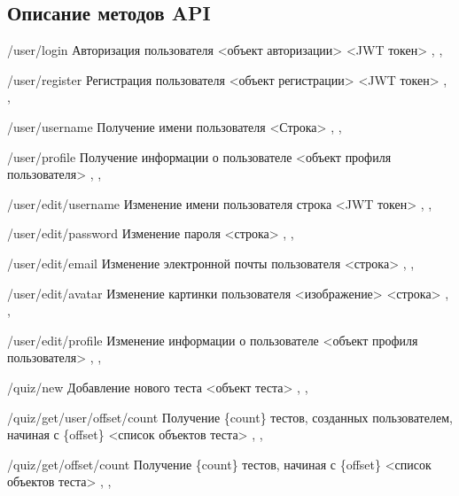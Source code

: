 


\subsection{Описание методов API}

 {/user/login}
{Авторизация пользователя}
{<объект авторизации>}
{<JWT токен>}
{ \sep {} \sep {}}

 {/user/register}
{Регистрация пользователя}
{<объект регистрации>}
{<JWT токен>}
{ \sep {} \sep {}}

 {/user/username}
{Получение имени пользователя}
{}
{<Строка>}
{ \sep {} \sep {}}


 {/user/profile}
{Получение информации о пользователе}
{}
{<объект профиля пользователя>}
{ \sep {} \sep {}}



 {/user/edit/username}
{Изменение имени пользователя}
{строка}
{<JWT токен>}
{ \sep {} \sep {}}


 {/user/edit/password}
{Изменение пароля}
{<строка>}
{}
{ \sep {} \sep {}}

 {/user/edit/email}
{Изменение электронной почты пользователя}
{<строка>}
{}
{ \sep {} \sep {}}

 {/user/edit/avatar}
{Изменение картинки пользователя}
{<изображение>}
{<строка>}
{ \sep {} \sep {}}

 {/user/edit/profile}
{Изменение информации о пользователе}
{<объект профиля пользователя>}
{}
{ \sep {} \sep {}}


 {/quiz/new}
{Добавление нового теста}
{<объект теста>}
{}
{ \sep {} \sep {}}

 {/quiz/get/user/{offset}/{count}}
{Получение \{count\} тестов, созданных пользователем, начиная с \{offset\}}
{}
{<список объектов теста>}
{ \sep {} \sep {}}

 {/quiz/get/{offset}/{count}}
{Получение \{count\} тестов, начиная с \{offset\}}
{}
{<список объектов теста>}
{ \sep {} \sep {}}

